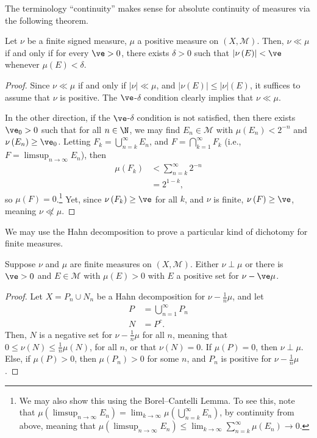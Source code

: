 \documentclass[10pt]{mypackage}
\begin{document}
The terminology ``continuity'' makes sense for absolute continuity of measures via the following theorem.
\begin{theorem}
  Let $\nu$ be a finite signed measure, $\mu$ a positive measure on $\left( X,\mathcal{M} \right)$. Then, $\nu\ll\mu$ if and only if for every $\ve > 0$, there exists $\delta > 0$ such that $\left\vert \nu\left( E \right) \right\vert < \ve$ whenever $\mu\left( E \right) < \delta$.
\end{theorem}
\begin{proof}
  Since $\nu\ll\mu$ if and only if $\left\vert \nu \right\vert\ll\mu$, and $\left\vert \nu\left( E \right) \right\vert \leq \left\vert \nu \right\vert\left( E \right)$, it suffices to assume that $\nu$ is positive. The $\ve$-$\delta$ condition clearly implies that $\nu\ll\mu$.\newline

  In the other direction, if the $\ve$-$\delta$ condition is not satisfied, then there exists $\ve_0 > 0$ such that for all $n\in \N$, we may find $E_{n}\in \mathcal{M}$ with $\mu\left( E_n \right) < 2^{-n}$ and $\nu\left( E_n \right) \geq \ve_0$. Letting $F_k = \bigcup_{n=k}^{\infty} E_n$, and $F = \bigcap_{k=1}^{\infty}F_k$ (i.e., $F = \limsup_{n\rightarrow\infty} E_n$), then
  \begin{align*}
    \mu\left( F_k \right) &< \sum_{n=k}^{\infty} 2^{-n}\\
                          &= 2^{1-k},
  \end{align*}
  so $\mu\left( F \right) = 0$.\footnote{\scriptsize We may also show this using the Borel--Cantelli Lemma. To see this, note that $\mu\left( \limsup_{n\rightarrow\infty} E_n \right) = \lim_{k\rightarrow\infty}\mu\left( \bigcup_{n=k}^{\infty} E_n \right)$, by continuity from above, meaning that $\mu\left( \limsup_{n\rightarrow\infty} E_n \right) \leq \lim_{k\rightarrow\infty}\sum_{n=k}^{\infty} \mu\left( E_n \right)\rightarrow 0$.} Yet, since $\nu\left( F_k \right) \geq \ve$ for all $k$, and $\nu$ is finite, $\nu\left( F \right) \geq \ve$, meaning $\nu\not\ll\mu$.
\end{proof}
We may use the Hahn decomposition to prove a particular kind of dichotomy for finite measures.
\begin{lemma}
  Suppose $\nu$ and $\mu$ are finite measures on $\left( X,\mathcal{M} \right)$. Either $\nu\perp\mu$ or there is $\ve > 0$ and $E\in \mathcal{M}$ with $\mu\left( E \right) > 0$ with $E$ a positive set for $\nu - \ve \mu$.
\end{lemma}
\begin{proof}
  Let $X = P_n\cup N_n$ be a Hahn decomposition for $\nu - \frac{1}{n}\mu$, and let
  \begin{align*}
    P &= \bigcup_{n=1}^{\infty}P_n\\
    N &= P^{c}.
  \end{align*}
  Then, $N$ is a negative set for $\nu - \frac{1}{n}\mu$ for all $n$, meaning that $0 \leq \nu\left( N \right) \leq \frac{1}{n}\mu\left( N \right)$, for all $n$, or that $\nu\left( N \right) = 0$. If $\mu\left( P \right) = 0$, then $\nu\perp\mu$. Else, if $\mu\left( P \right) > 0$, then $\mu\left( P_n \right) > 0$ for some $n$, and $P_n$ is positive for $\nu - \frac{1}{n}\mu$.
\end{proof}
\end{document}
